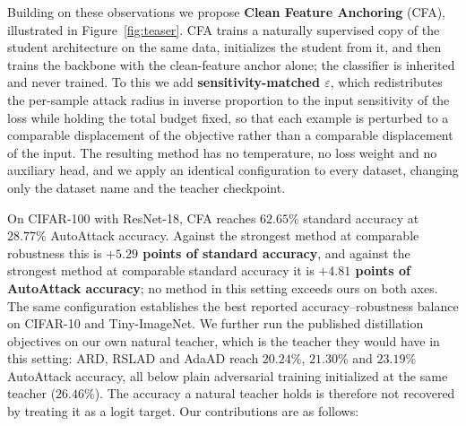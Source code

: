 Building on these observations we propose \textbf{Clean Feature Anchoring} (CFA), illustrated in
Figure~\ref{fig:teaser}. CFA trains a naturally supervised copy of the student architecture on the
same data, initializes the student from it, and then trains the backbone with the clean-feature
anchor alone; the classifier is inherited and never trained. To this we add
\textbf{sensitivity-matched $\varepsilon$}, which redistributes the per-sample attack radius in
inverse proportion to the input sensitivity of the loss while holding the total budget fixed, so that
each example is perturbed to a comparable displacement of the objective rather than a comparable
displacement of the input. The resulting method has no temperature, no loss weight and no auxiliary
head, and we apply an identical configuration to every dataset, changing only the dataset name and
the teacher checkpoint.

On CIFAR-100 with ResNet-18, CFA reaches $62.65\%$ standard accuracy at $28.77\%$ AutoAttack
accuracy. Against the strongest method at comparable robustness this is \textbf{$+5.29$ points of
standard accuracy}, and against the strongest method at comparable standard accuracy it is
\textbf{$+4.81$ points of AutoAttack accuracy}; no method in this setting exceeds ours on both axes.
The same configuration establishes the best reported accuracy--robustness balance on CIFAR-10 and
Tiny-ImageNet. We further run the published distillation objectives on our own natural teacher, which
is the teacher they would have in this setting: ARD, RSLAD and AdaAD reach $20.24\%$, $21.30\%$ and
$23.19\%$ AutoAttack accuracy, all below plain adversarial training initialized at the same teacher
($26.46\%$). The accuracy a natural teacher holds is therefore not recovered by treating it as a logit
target. Our contributions are as follows:

